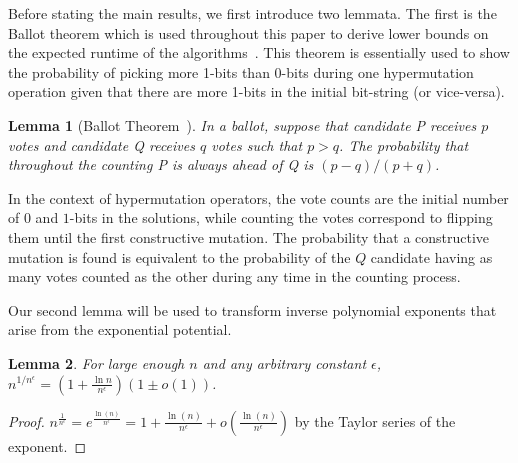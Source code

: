 \documentclass[lettersize,journal]{IEEEtran}
\newtheorem{lemma}{Lemma}
\begin{document}
Before stating the main results, we first introduce two lemmata. The first is the Ballot theorem which is used throughout this paper to derive lower bounds on the expected runtime of the algorithms~\cite{feller1968,JansenZarges2011,CorusOlivetoYazdani2019TCS}.  This theorem is essentially used to show the probability of picking more 1-bits than 0-bits during one hypermutation operation given that there are more 1-bits in the initial bit-string (or vice-versa). 
\begin{lemma} [Ballot Theorem~\cite{feller1968}] \label{lem:ballot} 
In a ballot, suppose that candidate P receives $p$ votes and candidate Q receives $q$ votes such that $p>q$. The probability that throughout the counting P is always ahead of Q is $(p-q)/(p+q)$. 
\end{lemma}

{\color{black}In the context of hypermutation operators, the vote counts are the initial number of $0$ and $1$-bits in the solutions, while counting the votes correspond to flipping them until the first constructive mutation. The probability that a constructive mutation is found is equivalent to the probability of the $Q$ candidate having as many votes counted as the other during any time in the counting process.}

Our second lemma will be used to transform inverse polynomial exponents that arise from the exponential potential.
\begin{lemma}\label{lem:expo}
	For large enough $n$ and {\color{black}any arbitrary constant} $\epsilon$, 
	$n^{1/n^{\epsilon}}= (1+\frac{\ln{n}}{n^{\epsilon}})(1 \pm o(1))$.
\end{lemma}
\begin{proof}
	$n^{\frac{1}{n^\epsilon}} = e^{\frac{\ln(n)}{n^\epsilon}} = 1 + \frac{\ln(n)}{n^\epsilon} + o(\frac{\ln(n)}{n^\epsilon})$ by the Taylor series of the exponent.
\end{proof}
\end{document}
